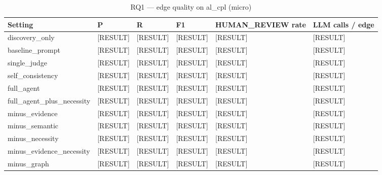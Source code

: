 \begin{table}[t]
\centering
\caption{RQ1 --- edge quality on al\_cpl (micro)}
\label{tab:rq1_al_cpl_micro}
\small
\begin{tabular}{llllll}
\toprule
Setting & P & R & F1 & HUMAN\_REVIEW rate & LLM calls / edge \\
\midrule
discovery\_only & [RESULT] & [RESULT] & [RESULT] & [RESULT] & [RESULT] \\
baseline\_prompt & [RESULT] & [RESULT] & [RESULT] & [RESULT] & [RESULT] \\
single\_judge & [RESULT] & [RESULT] & [RESULT] & [RESULT] & [RESULT] \\
self\_consistency & [RESULT] & [RESULT] & [RESULT] & [RESULT] & [RESULT] \\
full\_agent & [RESULT] & [RESULT] & [RESULT] & [RESULT] & [RESULT] \\
full\_agent\_plus\_necessity & [RESULT] & [RESULT] & [RESULT] & [RESULT] & [RESULT] \\
minus\_evidence & [RESULT] & [RESULT] & [RESULT] & [RESULT] & [RESULT] \\
minus\_semantic & [RESULT] & [RESULT] & [RESULT] & [RESULT] & [RESULT] \\
minus\_necessity & [RESULT] & [RESULT] & [RESULT] & [RESULT] & [RESULT] \\
minus\_evidence\_necessity & [RESULT] & [RESULT] & [RESULT] & [RESULT] & [RESULT] \\
minus\_graph & [RESULT] & [RESULT] & [RESULT] & [RESULT] & [RESULT] \\
\bottomrule
\end{tabular}
\end{table}

